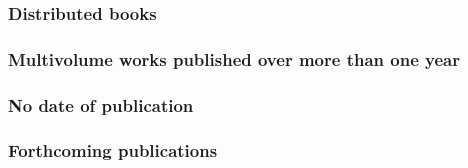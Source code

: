 \documentclass[11pt,letterpaper,oneside]{article}
\begin{document}
\begin{citebib}
\item \cite{strauss1962}
\end{citebib}

\subsubsection{Distributed books}

\begin{citebib}
\item \cite{willke2007}
\end{citebib}

\setcounter{subsubsection}{143}
\subsubsection{Multivolume works published over more than one year}

\begin{citebib}
\item \cite[329]{hayek1988}
\item \cite{tillich1951}
\end{citebib}

\subsubsection{No date of publication}

\begin{citebib}
\item \cite{boston}
\item \cite{edinburgh1750}
\item \cite{edinburgh}
\end{citebib}

\subsubsection{Forthcoming publications}

\begin{citebib}
\item \cite{author}
\item \cite[345--46]{writer}
\item \cite{contributor}
\end{citebib}

\setcounter{subsubsection}{158}
\end{document}
